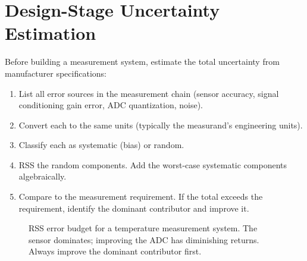 \documentclass[11pt,letterpaper,twoside,openany]{book}
\newcommand{\degC}{\ensuremath{{}^{\circ}\text{C}}}
\begin{document}
\section{Design-Stage Uncertainty Estimation}

Before building a measurement system, estimate the total uncertainty from manufacturer specifications:

\begin{enumerate}[leftmargin=1.5em]
\item List all error sources in the measurement chain (sensor accuracy, signal conditioning gain error, ADC quantization, noise).
\item Convert each to the same units (typically the measurand's engineering units).
\item Classify each as systematic (bias) or random.
\item RSS the random components. Add the worst-case systematic components algebraically.
\item Compare to the measurement requirement. If the total exceeds the requirement, identify the dominant contributor and improve it.
\end{enumerate}

\begin{figure}[htbp]
\centering
{}
\caption{RSS error budget for a temperature measurement system. The sensor dominates; improving the ADC has diminishing returns. Always improve the dominant contributor first.}
\label{fig:error_budget}
\end{figure}
\end{document}

